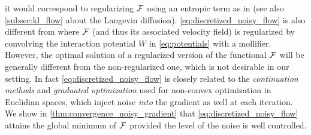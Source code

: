 it would correspond to regularizing ${{\mathcal F}}$ using an entropic term as in \cite{mei2018mean,csimcsekli2018sliced} (see also \cref{subsec:kl_flow} about the Langevin diffusion). \cref{eq:discretized_noisy_flow} is also different from \cite{craig2016blob,carrillo2019blob} where ${{\mathcal F}}$ (and thus its associated velocity field) is regularized by convolving the interaction potential $W$ in \cref{eq:potentials} with a mollifier. However, the optimal solution of a regularized version of the functional ${{\mathcal F}}$ will be generally different from the non-regularized one, which is not desirable in our setting. 
In fact \cref{eq:discretized_noisy_flow} is  closely related to the \textit{continuation methods} \cite{Gulcehre:2016a,Gulcehre:2016,Chaudhari:2017}  and \textit{graduated optimization} \cite{Hazan:2015} used for non-convex optimization in Euclidian spaces, which inject noise \textit{into} the gradient as well at each iteration. %
We show in \cref{thm:convergence_noisy_gradient} that \cref{eq:discretized_noisy_flow} attains the global minimum of ${{\mathcal F}}$ provided the level of the noise is well controlled. %
